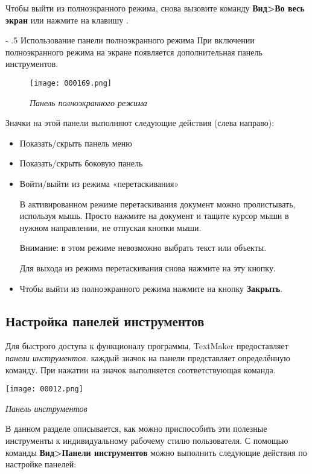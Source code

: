 ﻿\documentclass[a4paper,10pt]{article}
\makeatletter
\renewcommand\paragraph{%
   \@startsection{paragraph}{4}{0mm}%
      {-\baselineskip}%
      {.5\baselineskip}%
      {\normalfont\normalsize\bfseries}}
\makeatother
\begin{document}
Чтобы выйти из полноэкранного режима, снова вызовите команду \textbf{Вид>Во весь экран} или нажмите на клавишу .

\paragraph{Использование панели полноэкранного режима}
При включении полноэкранного режима на экране появляется дополнительная панель инструментов.

\begin{figure}[ht]
\texttt{[image: 000169.png]} 
\centering
\caption{\textit{Панель полноэкранного режима}}
\end{figure}

Значки на этой панели выполняют следующие действия (слева направо):
\begin{itemize}
 \item Показать/скрыть панель меню
 \item Показать/скрыть боковую панель
 \item Войти/выйти из режима «перетаскивания»
 
 В активированном режиме перетаскивания документ можно пролистывать, используя мышь. Просто нажмите на документ и тащите курсор мыши в нужном направлении, не отпуская кнопки мыши.
 
 Внимание: в этом режиме невозможно выбрать текст или объекты.
 
 Для выхода из режима перетаскивания снова нажмите на эту кнопку.
 \item Чтобы выйти из полноэкранного режима нажмите на кнопку \textbf{Закрыть}.
\end{itemize}
 
\subsection{Настройка панелей инструментов} \label{sec:настрпанинстр}
Для быстрого доступа к функционалу программы, TextMaker предоставляет \textit{панели инструментов}. каждый значок на панели представляет определённую команду. При нажатии на значок выполняется соответствующая команда.

\texttt{[image: 00012.png]}

{\footnotesize\textit{Панель инструментов}}

В данном разделе описывается, как можно приспособить эти полезные инструменты к индивидуальному рабочему стилю пользователя. С помощью команды \textbf{Вид>Панели инструментов} можно выполнить следующие действия по настройке панелей:
\end{document}
